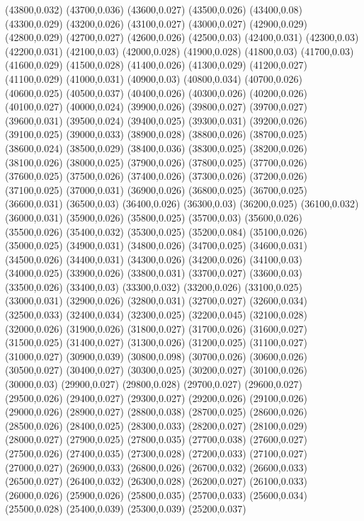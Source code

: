 (43800,0.032)
(43700,0.036)
(43600,0.027)
(43500,0.026)
(43400,0.08)
(43300,0.029)
(43200,0.026)
(43100,0.027)
(43000,0.027)
(42900,0.029)
(42800,0.029)
(42700,0.027)
(42600,0.026)
(42500,0.03)
(42400,0.031)
(42300,0.03)
(42200,0.031)
(42100,0.03)
(42000,0.028)
(41900,0.028)
(41800,0.03)
(41700,0.03)
(41600,0.029)
(41500,0.028)
(41400,0.026)
(41300,0.029)
(41200,0.027)
(41100,0.029)
(41000,0.031)
(40900,0.03)
(40800,0.034)
(40700,0.026)
(40600,0.025)
(40500,0.037)
(40400,0.026)
(40300,0.026)
(40200,0.026)
(40100,0.027)
(40000,0.024)
(39900,0.026)
(39800,0.027)
(39700,0.027)
(39600,0.031)
(39500,0.024)
(39400,0.025)
(39300,0.031)
(39200,0.026)
(39100,0.025)
(39000,0.033)
(38900,0.028)
(38800,0.026)
(38700,0.025)
(38600,0.024)
(38500,0.029)
(38400,0.036)
(38300,0.025)
(38200,0.026)
(38100,0.026)
(38000,0.025)
(37900,0.026)
(37800,0.025)
(37700,0.026)
(37600,0.025)
(37500,0.026)
(37400,0.026)
(37300,0.026)
(37200,0.026)
(37100,0.025)
(37000,0.031)
(36900,0.026)
(36800,0.025)
(36700,0.025)
(36600,0.031)
(36500,0.03)
(36400,0.026)
(36300,0.03)
(36200,0.025)
(36100,0.032)
(36000,0.031)
(35900,0.026)
(35800,0.025)
(35700,0.03)
(35600,0.026)
(35500,0.026)
(35400,0.032)
(35300,0.025)
(35200,0.084)
(35100,0.026)
(35000,0.025)
(34900,0.031)
(34800,0.026)
(34700,0.025)
(34600,0.031)
(34500,0.026)
(34400,0.031)
(34300,0.026)
(34200,0.026)
(34100,0.03)
(34000,0.025)
(33900,0.026)
(33800,0.031)
(33700,0.027)
(33600,0.03)
(33500,0.026)
(33400,0.03)
(33300,0.032)
(33200,0.026)
(33100,0.025)
(33000,0.031)
(32900,0.026)
(32800,0.031)
(32700,0.027)
(32600,0.034)
(32500,0.033)
(32400,0.034)
(32300,0.025)
(32200,0.045)
(32100,0.028)
(32000,0.026)
(31900,0.026)
(31800,0.027)
(31700,0.026)
(31600,0.027)
(31500,0.025)
(31400,0.027)
(31300,0.026)
(31200,0.025)
(31100,0.027)
(31000,0.027)
(30900,0.039)
(30800,0.098)
(30700,0.026)
(30600,0.026)
(30500,0.027)
(30400,0.027)
(30300,0.025)
(30200,0.027)
(30100,0.026)
(30000,0.03)
(29900,0.027)
(29800,0.028)
(29700,0.027)
(29600,0.027)
(29500,0.026)
(29400,0.027)
(29300,0.027)
(29200,0.026)
(29100,0.026)
(29000,0.026)
(28900,0.027)
(28800,0.038)
(28700,0.025)
(28600,0.026)
(28500,0.026)
(28400,0.025)
(28300,0.033)
(28200,0.027)
(28100,0.029)
(28000,0.027)
(27900,0.025)
(27800,0.035)
(27700,0.038)
(27600,0.027)
(27500,0.026)
(27400,0.035)
(27300,0.028)
(27200,0.033)
(27100,0.027)
(27000,0.027)
(26900,0.033)
(26800,0.026)
(26700,0.032)
(26600,0.033)
(26500,0.027)
(26400,0.032)
(26300,0.028)
(26200,0.027)
(26100,0.033)
(26000,0.026)
(25900,0.026)
(25800,0.035)
(25700,0.033)
(25600,0.034)
(25500,0.028)
(25400,0.039)
(25300,0.039)
(25200,0.037)
